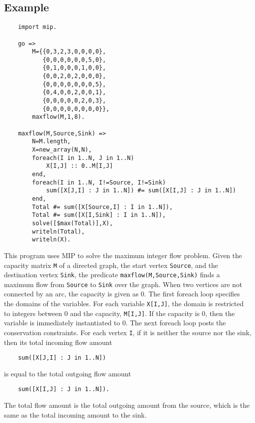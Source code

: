 \subsection*{Example}
\begin{verbatim}
    import mip.

    go =>
        M={{0,3,2,3,0,0,0,0},
           {0,0,0,0,0,0,5,0},
           {0,1,0,0,0,1,0,0},
           {0,0,2,0,2,0,0,0},
           {0,0,0,0,0,0,0,5},
           {0,4,0,0,2,0,0,1},
           {0,0,0,0,0,2,0,3},
           {0,0,0,0,0,0,0,0}},
        maxflow(M,1,8).

    maxflow(M,Source,Sink) =>
        N=M.length,
        X=new_array(N,N),
        foreach(I in 1..N, J in 1..N)
            X[I,J] :: 0..M[I,J]
        end,
        foreach(I in 1..N, I!=Source, I!=Sink)
            sum([X[J,I] : J in 1..N]) #= sum([X[I,J] : J in 1..N]) 
        end,
        Total #= sum([X[Source,I] : I in 1..N]),
        Total #= sum([X[I,Sink] : I in 1..N]),
        solve([$max(Total)],X),
        writeln(Total),
        writeln(X).
\end{verbatim}
This program uses MIP to solve the maximum integer flow problem. Given the capacity matrix \texttt{M} of a directed graph, the start vertex \texttt{Source}, and the destination vertex \texttt{Sink}, the predicate \texttt{maxflow(M,Source,Sink)} finds a maximum flow from \texttt{Source} to \texttt{Sink} over the graph. When two vertices are not connected by an arc, the capacity is given as 0. The first foreach loop specifies the domains of the variables. For each variable \texttt{X[I,J]}, the domain is restricted to integers between 0 and the capacity, \texttt{M[I,J]}. If the capacity is 0, then the variable is immediately instantiated to 0. The next foreach loop posts the conservation constraints. For each vertex \texttt{I}, if it is neither the source nor the sink, then its total incoming flow amount 
\begin{verbatim}
    sum([X[J,I] : J in 1..N])
\end{verbatim}
is equal to the total outgoing flow amount 
\begin{verbatim}
    sum([X[I,J] : J in 1..N]).
\end{verbatim}
The total flow amount is the total outgoing amount from the source, which is the same as the total incoming amount to the sink.

